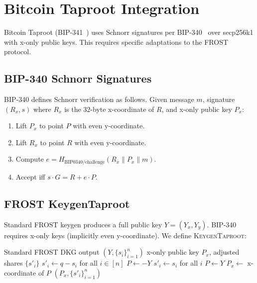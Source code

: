\documentclass[11pt,twocolumn]{article}
\begin{document}
\section{Bitcoin Taproot Integration}
\label{sec:taproot}

Bitcoin Taproot (BIP-341~\cite{bip341}) uses Schnorr signatures per BIP-340~\cite{bip340}
over secp256k1 with x-only public keys. This requires specific adaptations to the
FROST protocol.

\subsection{BIP-340 Schnorr Signatures}

BIP-340 defines Schnorr verification as follows. Given message $m$, signature
$(R_x, s)$ where $R_x$ is the 32-byte x-coordinate of $R$, and x-only public key
$P_x$:

\begin{enumerate}[nosep]
  \item Lift $P_x$ to point $P$ with even y-coordinate.
  \item Lift $R_x$ to point $R$ with even y-coordinate.
  \item Compute $e = H_{\text{BIP0340/challenge}}(R_x \| P_x \| m)$.
  \item Accept iff $s \cdot G = R + e \cdot P$.
\end{enumerate}

\subsection{FROST KeygenTaproot}

Standard FROST keygen produces a full public key $Y = (Y_x, Y_y)$. BIP-340 requires
x-only keys (implicitly even y-coordinate). We define \textsc{KeygenTaproot}:

\begin{algorithm}[H]
\caption{FROST KeygenTaproot}
\label{alg:frost-taproot-keygen}
\begin{algorithmic}[1]
\Require Standard FROST DKG output $(Y, \{s_i\}_{i=1}^n)$
\Ensure x-only public key $P_x$, adjusted shares $\{s'_i\}$
  \State $s'_i \gets q - s_i$ for all $i \in [n]$ 
  \State $P \gets -Y$ 
\Else
  \State $s'_i \gets s_i$ for all $i$
  \State $P \gets Y$
\EndIf
\State $P_x \gets$ x-coordinate of $P$ 
\State \Return $(P_x, \{s'_i\}_{i=1}^n)$
\end{algorithmic}
\end{algorithm}
\end{document}
